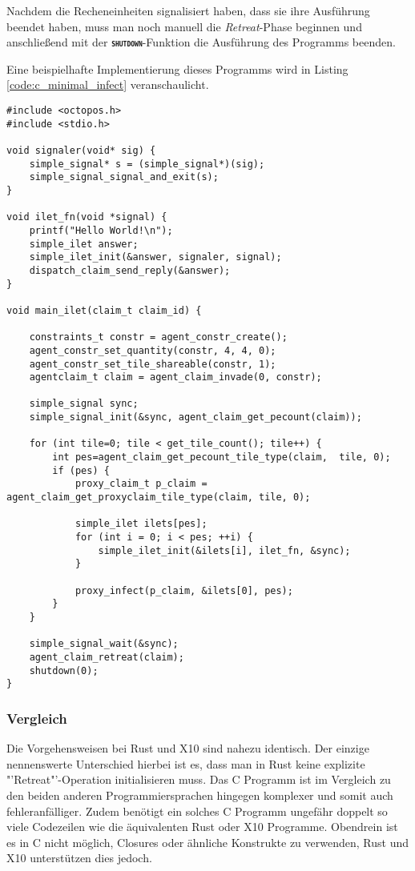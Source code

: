 Nachdem die Recheneinheiten signalisiert haben, dass sie ihre Ausführung beendet haben, muss man noch manuell
die \textit{Retreat}-Phase beginnen und anschließend mit der \texttt{\textsc{\textbf{shutdown}}}-Funktion
die Ausführung des Programms beenden.

Eine beispielhafte Implementierung dieses Programms wird in Listing \ref{code:c_minimal_infect} veranschaulicht.

\lstset{basicstyle=\tiny}
\begin{lstlisting}[float,caption={Minimales Invade, Infect, Retreat in C},label=code:c_minimal_infect]
#include <octopos.h>
#include <stdio.h>

void signaler(void* sig) {
    simple_signal* s = (simple_signal*)(sig);
    simple_signal_signal_and_exit(s);
}

void ilet_fn(void *signal) {
    printf("Hello World!\n");
    simple_ilet answer;
    simple_ilet_init(&answer, signaler, signal);
    dispatch_claim_send_reply(&answer);
}

void main_ilet(claim_t claim_id) {

    constraints_t constr = agent_constr_create();
    agent_constr_set_quantity(constr, 4, 4, 0);
    agent_constr_set_tile_shareable(constr, 1);
    agentclaim_t claim = agent_claim_invade(0, constr);

    simple_signal sync;
    simple_signal_init(&sync, agent_claim_get_pecount(claim));

    for (int tile=0; tile < get_tile_count(); tile++) {
        int pes=agent_claim_get_pecount_tile_type(claim,  tile, 0);
        if (pes) {
            proxy_claim_t p_claim = agent_claim_get_proxyclaim_tile_type(claim, tile, 0);

            simple_ilet ilets[pes];
            for (int i = 0; i < pes; ++i) {
                simple_ilet_init(&ilets[i], ilet_fn, &sync);
            }

            proxy_infect(p_claim, &ilets[0], pes);
        }
    }

    simple_signal_wait(&sync);
    agent_claim_retreat(claim);
    shutdown(0);
}
\end{lstlisting}
\lstset{basicstyle=\normalsize}

\subsubsection{Vergleich}

Die Vorgehensweisen bei Rust und X10 sind nahezu identisch. Der einzige nennenswerte Unterschied hierbei ist es, dass
man in Rust keine explizite "'Retreat"'-Operation initialisieren muss.
Das C Programm ist im Vergleich zu den beiden anderen Programmiersprachen hingegen komplexer und somit auch
fehleranfälliger. Zudem benötigt ein solches C Programm ungefähr doppelt so viele 
Codezeilen wie die äquivalenten Rust oder X10 Programme. Obendrein ist es in C nicht möglich, Closures oder
ähnliche Konstrukte zu verwenden, Rust und X10 unterstützen dies jedoch.
